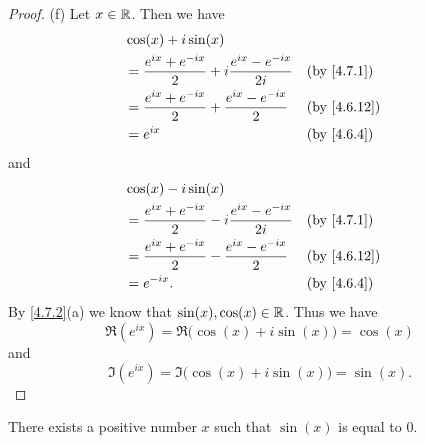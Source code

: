 \begin{proof}{(f)}
  Let \(x \in \mathbb{R}\).
  Then we have
  \begin{align*}
     & \cos(x) + i \sin(x)                                                                   \\
     & = \dfrac{e^{i x} + e^{- i x}}{2} + i \dfrac{e^{i x} - e^{- i x}}{2i} &  & \by{4.7.1}  \\
     & = \dfrac{e^{i x} + e^{- i x}}{2} + \dfrac{e^{i x} - e^{- i x}}{2}    &  & \by{4.6.12} \\
     & = e^{i x}                                                            &  & \by{4.6.4}
  \end{align*}
  and
  \begin{align*}
     & \cos(x) - i \sin(x)                                                                   \\
     & = \dfrac{e^{i x} + e^{- i x}}{2} - i \dfrac{e^{i x} - e^{- i x}}{2i} &  & \by{4.7.1}  \\
     & = \dfrac{e^{i x} + e^{- i x}}{2} - \dfrac{e^{i x} - e^{- i x}}{2}    &  & \by{4.6.12} \\
     & = e^{- i x}.                                                         &  & \by{4.6.4}
  \end{align*}
  By \cref{4.7.2}(a) we know that \(\sin(x), \cos(x) \in \mathbb{R}\).
  Thus we have
  \[
    \Re(e^{i x}) = \Re\big(\cos(x) + i \sin(x)\big) = \cos(x)
  \]
  and
  \[
    \Im(e^{i x}) = \Im\big(\cos(x) + i \sin(x)\big) = \sin(x).
  \]
\end{proof}

\begin{lem}\label{4.7.3}
  There exists a positive number \(x\) such that \(\sin(x)\) is equal to \(0\).
\end{lem}

